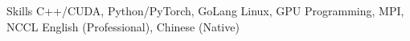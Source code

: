 
\begin{rubric}{Skills}
\entry*[Programming]
	C++/CUDA, Python/PyTorch, GoLang
\entry*[Systems]
	Linux, GPU Programming, MPI, NCCL
\entry*[Languages]
	English (Professional), Chinese (Native)
\end{rubric}
